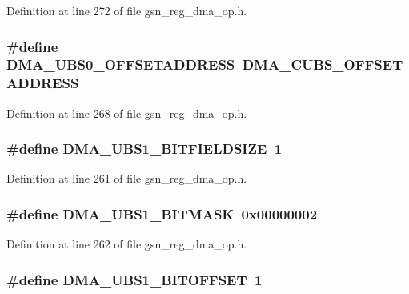 Definition at line 272 of file gsn\_\-reg\_\-dma\_\-op.h.

\hypertarget{a00547_a3fcb52ea5762aec6e08d9402b01d0f32}{
\subsubsection[{DMA\_\-UBS0\_\-OFFSETADDRESS}]{\setlength{\rightskip}{0pt plus 5cm}\#define DMA\_\-UBS0\_\-OFFSETADDRESS~DMA\_\-CUBS\_\-OFFSETADDRESS}}
\label{a00547_a3fcb52ea5762aec6e08d9402b01d0f32}


Definition at line 268 of file gsn\_\-reg\_\-dma\_\-op.h.

\hypertarget{a00547_ad8b65d19365227f764e3906c72f7a96b}{
\subsubsection[{DMA\_\-UBS1\_\-BITFIELDSIZE}]{\setlength{\rightskip}{0pt plus 5cm}\#define DMA\_\-UBS1\_\-BITFIELDSIZE~1}}
\label{a00547_ad8b65d19365227f764e3906c72f7a96b}


Definition at line 261 of file gsn\_\-reg\_\-dma\_\-op.h.

\hypertarget{a00547_a6464b961077ef5a80528065aca28c708}{
\subsubsection[{DMA\_\-UBS1\_\-BITMASK}]{\setlength{\rightskip}{0pt plus 5cm}\#define DMA\_\-UBS1\_\-BITMASK~0x00000002}}
\label{a00547_a6464b961077ef5a80528065aca28c708}


Definition at line 262 of file gsn\_\-reg\_\-dma\_\-op.h.

\hypertarget{a00547_a46105c7a3f7eef51b62bc01ab43dc1e0}{
\subsubsection[{DMA\_\-UBS1\_\-BITOFFSET}]{\setlength{\rightskip}{0pt plus 5cm}\#define DMA\_\-UBS1\_\-BITOFFSET~1}}
\label{a00547_a46105c7a3f7eef51b62bc01ab43dc1e0}


